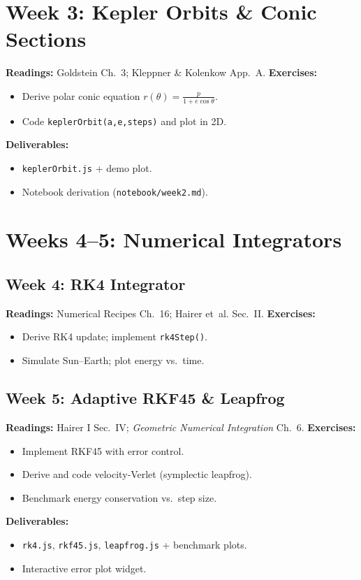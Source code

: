 \documentclass[11pt]{article}
\begin{document}
\section{Week 3: Kepler Orbits \& Conic Sections}
\textbf{Readings:} Goldstein Ch.~3; Kleppner \& Kolenkow App.~A.  
\textbf{Exercises:}
\begin{itemize}
  \item Derive polar conic equation \(r(\theta)=\frac{p}{1+e\cos\theta}\).
  \item Code \texttt{keplerOrbit(a,e,steps)} and plot in 2D.
\end{itemize}
\textbf{Deliverables:}
\begin{itemize}
  \item \texttt{keplerOrbit.js} + demo plot.
  \item Notebook derivation (\texttt{notebook/week2.md}).
\end{itemize}

\section{Weeks 4--5: Numerical Integrators}
\subsection{Week 4: RK4 Integrator}
\textbf{Readings:} Numerical Recipes Ch.~16; Hairer et al. Sec.~II.  
\textbf{Exercises:}
\begin{itemize}
  \item Derive RK4 update; implement \texttt{rk4Step()}.
  \item Simulate Sun–Earth; plot energy vs.\ time.
\end{itemize}
\subsection{Week 5: Adaptive RKF45 \& Leapfrog}
\textbf{Readings:} Hairer I Sec.~IV; \emph{Geometric Numerical Integration} Ch.~6.  
\textbf{Exercises:}
\begin{itemize}
  \item Implement RKF45 with error control.
  \item Derive and code velocity‑Verlet (symplectic leapfrog).
  \item Benchmark energy conservation vs.\ step size.
\end{itemize}
\textbf{Deliverables:}
\begin{itemize}
  \item \texttt{rk4.js}, \texttt{rkf45.js}, \texttt{leapfrog.js} + benchmark plots.
  \item Interactive error plot widget.
\end{itemize}
\end{document}
